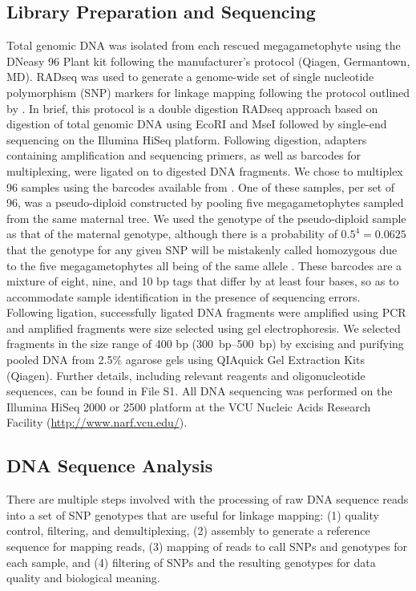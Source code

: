 \documentclass[11pt]{article}
\begin{document}
\subsection*{Library Preparation and Sequencing}
Total genomic DNA was isolated from each rescued megagametophyte using the DNeasy 96 Plant 
kit following the manufacturer’s protocol (Qiagen, Germantown, MD). RADseq \citep{Davey:2010, Parchman:2012, Peterson:2012} 
was used to generate a genome-wide set of 
single nucleotide polymorphism (SNP) markers for linkage mapping following the protocol 
outlined by \citet{Parchman:2012}. In brief, this protocol is a double digestion RADseq 
approach based on digestion of total genomic DNA using EcoRI and MseI followed by single-end 
sequencing on the Illumina HiSeq platform. Following digestion, adapters 
containing amplification and sequencing primers, as well as barcodes for multiplexing, 
were ligated on to digested DNA fragments. We chose to multiplex 96 samples using the 
barcodes available from \citet{Parchman:2012}. One of these samples, per set of 96, was a pseudo-diploid
constructed by pooling five megagametophytes sampled from the same maternal tree. We used the genotype of the
pseudo-diploid sample as that of the maternal genotype, although there is a probability of $0.5^{4} = 0.0625$ that 
the genotype for any given SNP will be mistakenly called homozygous due to the five megagametophytes all being of the same allele \citep[see][]{Morris:1978}.
These barcodes are a mixture of eight, nine, and  10 bp tags that differ by at least four bases, so as to accommodate
sample identification in the presence of sequencing errors. Following ligation, successfully ligated DNA fragments were 
amplified using PCR and amplified fragments were size selected using gel electrophoresis. We selected 
fragments in the size range of 400 bp (\SIrange{300}{500}{bp}) by excising and purifying pooled DNA from 2.5\% 
agarose gels using QIAquick Gel Extraction Kits (Qiagen). Further details, including relevant reagents and 
oligonucleotide sequences, can be found in File S1. All DNA sequencing was performed on the Illumina HiSeq 2000 or 2500
platform at the VCU Nucleic Acids Research Facility (\url{http://www.narf.vcu.edu/}).

\subsection*{DNA Sequence Analysis}
There are multiple steps involved with the processing of raw DNA sequence reads into a set of SNP genotypes that are useful for linkage mapping:
(1) quality control, filtering, and demultiplexing, (2) assembly to generate a reference sequence for mapping reads, (3) mapping 
of reads to call SNPs and genotypes for each sample, and (4) filtering of SNPs and the resulting genotypes for
data quality and biological meaning.
\end{document}
